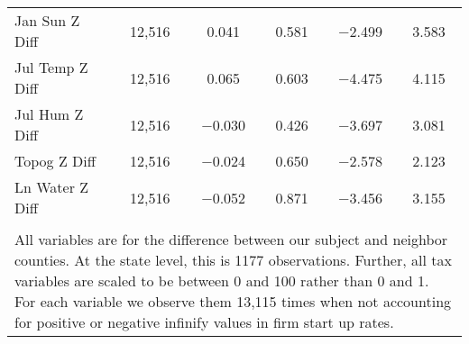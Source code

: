 \begin{table}[!htbp]
\begin{tabular}{@{\extracolsep{5pt}}lccccc}
Jan Sun Z Diff & 12,516 & 0.041 & 0.581 & $-$2.499 & 3.583 \\ 
Jul Temp Z Diff & 12,516 & 0.065 & 0.603 & $-$4.475 & 4.115 \\ 
Jul Hum Z Diff & 12,516 & $-$0.030 & 0.426 & $-$3.697 & 3.081 \\ 
Topog Z Diff & 12,516 & $-$0.024 & 0.650 & $-$2.578 & 2.123 \\ 
Ln Water Z Diff & 12,516 & $-$0.052 & 0.871 & $-$3.456 & 3.155 \\ 
\hline \\[-1.8ex] 
\multicolumn{6}{l}{All variables are for the difference between our subject and neighbor counties. At the state level, this is 1177 observations. Further, all tax variables are scaled to be between 0 and 100 rather than 0 and 1. For each variable we observe them 13,115 times when not accounting for positive or negative infinify values in firm start up rates.} \\ 
\end{tabular} 
\end{table} 
